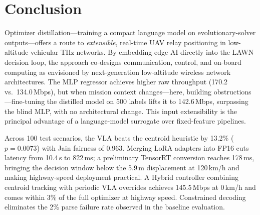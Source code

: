 \documentclass[journal]{IEEEtran}
\begin{document}
%
%
%


\section{Conclusion}
\label{sec:conclusion}

Optimizer distillation---training a compact language model on evolutionary-solver outputs---offers a route to \emph{extensible}, real-time UAV relay positioning in low-altitude vehicular THz networks. By embedding edge AI directly into the LAWN decision loop, the approach co-designs communication, control, and on-board computing as envisioned by next-generation low-altitude wireless network architectures. The MLP regressor achieves higher raw throughput (170.2 vs.\ 134.0\,Mbps), but when mission context changes---here, building obstructions---fine-tuning the distilled model on 500 labels lifts it to 142.6\,Mbps, surpassing the blind MLP, with no architectural change. This input extensibility is the principal advantage of a language-model surrogate over fixed-feature pipelines.

Across 100 test scenarios, the VLA beats the centroid heuristic by 13.2\% ($p{=}0.0073$) with Jain fairness of 0.963. Merging LoRA adapters into FP16 cuts latency from 10.4\,s to 822\,ms; a preliminary TensorRT conversion reaches 178\,ms, bringing the decision window below the 5.9\,m displacement at 120\,km/h and making highway-speed deployment practical. A Hybrid controller combining centroid tracking with periodic VLA overrides achieves 145.5\,Mbps at 0\,km/h and comes within 3\% of the full optimizer at highway speed. Constrained decoding eliminates the 2\% parse failure rate observed in the baseline evaluation.
\end{document}
